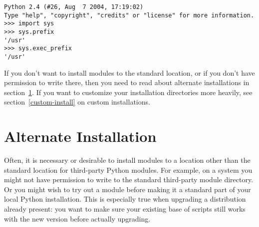 \documentclass{howto}
\begin{document}
\begin{verbatim}
Python 2.4 (#26, Aug  7 2004, 17:19:02) 
Type "help", "copyright", "credits" or "license" for more information.
>>> import sys
>>> sys.prefix
'/usr'
>>> sys.exec_prefix
'/usr'
\end{verbatim}

If you don't want to install modules to the standard location, or if you
don't have permission to write there, then you need to read about
alternate installations in section~\ref{alt-install}.  If you want to
customize your installation directories more heavily, see
section~\ref{custom-install} on custom installations.



\newcommand{\installscheme}[8]
  {\begin{tableiii}{l|l|l}{textrm}
          {Type of file}
          {Installation Directory}
          {Override option}
     \lineiii{pure module distribution}
             {\filevar{#1}\filenq{#2}}
             {\longprogramopt{install-purelib}}
     \lineiii{non-pure module distribution}
             {\filevar{#3}\filenq{#4}}
             {\longprogramopt{install-platlib}}
     \lineiii{scripts}
             {\filevar{#5}\filenq{#6}}
             {\longprogramopt{install-scripts}}
     \lineiii{data}
             {\filevar{#7}\filenq{#8}}
             {\longprogramopt{install-data}}
   \end{tableiii}}


\section{Alternate Installation}
\label{alt-install}

Often, it is necessary or desirable to install modules to a location
other than the standard location for third-party Python modules.  For
example, on a \UNIX{} system you might not have permission to write to the
standard third-party module directory.  Or you might wish to try out a
module before making it a standard part of your local Python
installation.  This is especially true when upgrading a distribution
already present: you want to make sure your existing base of scripts
still works with the new version before actually upgrading.
\end{document}
